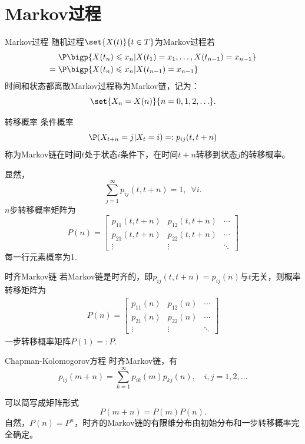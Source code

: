 \section{Markov过程}
\begin{definition}{Markov过程}{}
	随机过程$\set{X(t)}{t\in T}$为Markov过程若%
	\begin{align*}
		&\P\bigp{X(t_n)\leqslant x_n|X(t_1)=x_1,\ldots,X(t_{n-1})=x_{n-1}}\\
		={}&\P\bigp{X(t_n)\leqslant x_n|X(t_{n-1})=x_{n-1}}
	\end{align*}
	时间和状态都离散Markov过程称为Markov链，记为：
	\[
		\set{X_n=X(n)}{n=0,1,2,\ldots}.
	\]
\end{definition}
\begin{definition}{转移概率}{}
	条件概率 
	\[
		\P(X_{t+n}=j|X_t=i)=:p_{ij}(t,t+n)
	\]
	称为Markov链在时间$t$处于状态$i$条件下，在时间$t+n$转移到状态$j$的转移概率。
\end{definition}
显然，
\[
	\sum_{j=1}^\infty p_{ij}(t,t+n)=1,\enspace\forall i.
\]
$n$步转移概率矩阵为
\begin{equation}
	P(n)=\begin{bmatrix}
		p_{11}(t,t+n)&p_{12}(t,t+n)&\cdots\\
		p_{21}(t,t+n)&p_{22}(t,t+n)&\cdots\\
		\vdots&\vdots&\ddots
	\end{bmatrix}
\end{equation}
每一行元素概率为1.
\begin{definition}{时齐Markov链}{}
	若Markov链是时齐的，即$p_{ij}(t,t+n)=p_{ij}(n)$与$t$无关，则概率转移矩阵为
	\begin{align*}
		P(n)=\begin{bmatrix}
			p_{11}(n)&p_{12}(n)&\cdots\\
			p_{21}(n)&p_{22}(n)&\cdots\\
			\vdots&\vdots&\ddots
		\end{bmatrix}
	\end{align*}
	一步转移概率矩阵$P(1)=:P.$
\end{definition}
\begin{theorem}{Chapman-Kolomogorov方程}{}
	时齐Markov链，有
	\begin{equation*}
		p_{ij}(m+n)=\sum_{k=1}^\infty p_{ik}(m)p_{kj}(n),\quad i,j=1,2,\ldots
	\end{equation*}
\end{theorem}
可以简写成矩阵形式
\[
	P(m+n)=P(m)P(n).
\]
自然，$P(n)=P^n$，时齐的Markov链的有限维分布由初始分布和一步转移概率完全确定。
